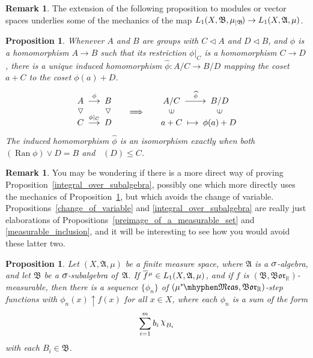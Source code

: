 \documentclass[
twoside=true,
paper=letter,
fontsize=9pt,
pagesize=auto,
leqno,
openany,
headsepline,
overfullrule,
]{scrbook}
\theoremstyle{plain}
\theoremstyle{plain}
\newtheorem{prop}[thm]{Proposition}
\theoremstyle{definition}
\newtheorem{rmk}[thm]{Remark}
\theoremstyle{bfnoteitalic}
\theoremstyle{bfnoteroman}
\newcommand{\sigalg}[1]{\mathfrak{#1}}
\newcommand{\normalin}{\vartriangleleft}
\newcommand{\normalup}{\rotatebox{90}{$\normalin$}}
\newcommand{\elementup}{\rotatebox{90}{$\in$}}
\DeclareMathOperator{\range}{Ran}
\newcommand{\borel}{\mathfrak{Bor}}
\newcommand{\textsigma}{\hbox{\large{$\sigma$}}\kern-1pt}
\newcommand{\charfunction}[1]{\mathop{{\raisebox{2pt}{$\chi$}}_{#1}}}
\newcommand{\restrictedto}[1]{_{\lvert#1}\kern-1.5pt}
\newcommand{\preimage}[1]{\mathop{#1^{\leftarrow}}}
\newcommand{\R}{\mathbb{R}}
\newcommand{\sigmaalgebra}{\sigalg{A}}
\newcommand{\sigmaalgebraii}{\sigalg{B}}
\newcommand{\measurable}[1]{{#1}\mhyphen\mathfrak{Meas}}
\newcommand{\kernast}{\ast\kern-1pt}
\newcommand{\measurespace}{X}
\newcommand{\measure}{\mu}
\newcommand{\measmu}{\mu}
\newcommand{\setii}{B}
\newcommand*\xbar[1]{%
   \hbox{%
     \vbox{%
       \hrule height 0.4pt %
       \kern0.4ex%
       \hbox{%
         \ensuremath{#1}%
       }%
     }%
   }%
}
\newcommand{\lebclass}[1]{\hspace{.5pt}\xbar{#1}\hspace{0.5pt}}
\newcommand{\ellclass}[2]{\lebclass{#1}^{#2}}
\begin{document}
\begin{rmk}
The extension of the following proposition to modules or vector spaces underlies some of the mechanics of the map
$L_1(\measurespace, \sigmaalgebraii, \measure\restrictedto{\sigmaalgebraii})
\to
L_1(\measurespace, \sigmaalgebra, \measure)$.
\end{rmk}


\begin{prop}\label{induced_quotient_homomorphism}
Whenever $A$ and $B$ are groups with $C\normalin A$ and $D\normalin B$, and $\phi$ is a homomorphism ${A\to B}$ such that its restriction $\phi\vert_C$ is a homomorphism $C\to D$, there is a unique induced homomorphism ${\widehat \phi :A/C\to B/D}$ mapping the coset $a+C$ to the coset $\phi(a)+D$. 
\[
\xymatrix@R=-2pt@C=12pt{
\ A\  \ar[r]^{\phi} & \ B\  & & \ A/C\ \ar[r]^{\widehat \phi} & \ B/D\ \\
\normalup & \normalup & \Longrightarrow & \elementup & \elementup \\
\ C\ \ar[r]^{\phi\vert_C} & \ D\  & & \ a+C\ \ar@{|->}[r] & \ \phi(a)+D\ }
\]
The induced homomorphism $\widehat \phi$ is an isomorphism exactly when both  $(\range \phi) \vee D = B$ and $\preimage{\phi}(D)\leq C$. 
\end{prop}

\begin{rmk}
You may be wondering if there is a more direct way of proving Proposition~\ref{integral_over_subalgebra}, possibly one which more directly uses the mechanics of Proposition~\ref{induced_quotient_homomorphism}, but which avoids the change of variable.  
Propositions~\ref{change_of_variable} and \ref{integral_over_subalgebra} are really just elaborations of Propositions~\ref{preimage_of_a_measurable_set} and \ref{measurable_inclusion}, and it will be interesting to see how you would avoid these latter two.
\end{rmk}


\begin{prop}\label{submeasurable_step_function}
Let $(\measurespace, \sigmaalgebra, \measmu)$ be a finite measure space, where
$\sigmaalgebra$ is a $\textsigma$\hyp{}algebra, and let $\sigmaalgebraii$ be a $\textsigma$\hyp{}subalgebra of
\,$\sigmaalgebra$.
If $\ellclass{f}{\measmu}
\in L_1(\measurespace, \sigmaalgebra, \measmu)$, and if $f$ is
$(\sigmaalgebraii, \borel_\R)$\hyp{}measurable, then there is a sequence
$\{ \phi_n \}$ of
$(\measurable{\measmu^\kernast}, \borel_\R)$\hyp{}step functions with
$\phi_n(x) \uparrow f(x)$ for all $x\in\measurespace$, where each $\phi_n$ is a sum of the form
\[
\sum_{i=1}^m b_i \charfunction{\setii_i}
\]
with each $\setii_i \in \sigmaalgebraii$.
\end{prop}
\end{document}

